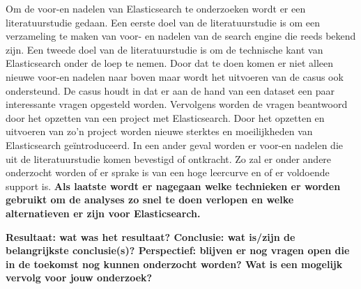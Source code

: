 Om de voor-en nadelen van Elasticsearch te onderzoeken wordt er een literatuurstudie gedaan. Een eerste doel van de literatuurstudie is om een verzameling te maken van voor- en nadelen van de search engine die reeds bekend zijn. Een tweede doel van de literatuurstudie is om de technische kant van Elasticsearch onder de loep te nemen. Door dat te doen komen er niet alleen nieuwe voor-en nadelen naar boven maar wordt het uitvoeren van de casus ook ondersteund. De casus houdt in dat er aan de hand van een dataset een paar interessante vragen
opgesteld worden. Vervolgens worden de vragen beantwoord door het opzetten van een project met Elasticsearch.
Door het opzetten en uitvoeren van zo'n project worden nieuwe sterktes en moeilijkheden van Elasticsearch geïntroduceerd. In een ander geval worden er voor-en nadelen die uit de literatuurstudie komen bevestigd of ontkracht. Zo zal er onder andere onderzocht worden of er sprake is van een hoge leercurve en of er voldoende support is. \textbf{Als laatste wordt er nagegaan welke technieken er worden gebruikt om de analyses zo snel te doen verlopen en welke alternatieven er zijn voor Elasticsearch.}

\textbf{Resultaat: wat was het resultaat?
Conclusie: wat is/zijn de belangrijkste conclusie(s)?
Perspectief: blijven er nog vragen open die in de toekomst nog kunnen
onderzocht worden? Wat is een mogelijk vervolg voor jouw onderzoek?}

